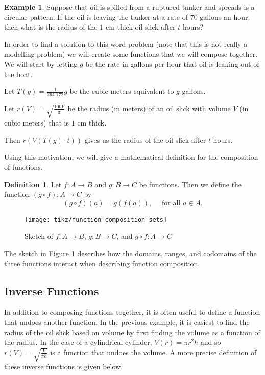 \documentclass[
]{book}
\theoremstyle{definition}
\newtheorem{definition}{Definition}[chapter]
\theoremstyle{definition}
\newtheorem{example}{Example}[chapter]
\theoremstyle{definition}
\theoremstyle{definition}
\theoremstyle{remark}
\begin{document}
\begin{example}
Suppose that oil is spilled from a ruptured tanker and spreads is a circular pattern. If the oil is leaving the tanker at a rate of 70 gallons an hour, then what is the radius of the \(1\) cm thick oil slick after \(t\) hours?

In order to find a solution to this word problem (note that this is not really a modelling problem) we will create some functions that we will compose together. We will start by letting \(g\) be the rate in gallons per hour that oil is leaking out of the boat.

Let \(T(g)=\frac{1}{264.172} g\) be the cubic meters equivalent to \(g\) gallons.

Let \(r(V)= \sqrt{\frac{100V}{\pi}}\) be the radius (in meters) of an oil slick with volume \(V\) (in cubic meters) that is \(1\) cm thick.

Then \(r(V(T(g)\cdot t))\) gives us the radius of the oil slick after \(t\) hours.
\end{example}

Using this motivation, we will give a mathematical definition for the composition of functions.

\begin{definition}
Let \(f:A\rightarrow B\) and \(g: B \rightarrow C\) be functions. Then we define the function \((g\circ f):A\rightarrow C\) by \[(g\circ f) (a)= g(f(a)), \quad \mbox{ for all } a \in A.\]
\end{definition}

\begin{figure}

{\centering \texttt{[image: tikz/function-composition-sets]} 

}

\caption{Sketch of $f:A \rightarrow B$, $g:B \rightarrow C$, and $g \circ f: A \rightarrow C$}\label{fig:function-composition}
\end{figure}

The sketch in Figure \ref{fig:function-composition} describes how the domains, ranges, and codomains of the three functions interact when describing function composition.

\hypertarget{inverse-functions}{%
\subsection{Inverse Functions}\label{inverse-functions}}

In addition to composing functions together, it is often useful to define a function that undoes another function. In the previous example, it is easiest to find the radius of the oil slick based on volume by first finding the volume as a function of the radius. In the case of a cylindrical cylinder, \(V(r)= \pi r^2 h\) and so \(r(V)=\sqrt{\frac{V}{\pi h}}\) is a function that undoes the volume. A more precise definition of these inverse functions is given below.
\end{document}
